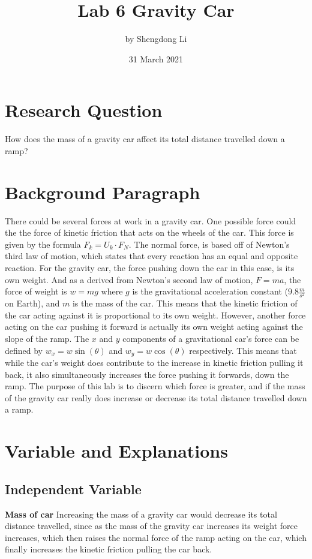 \documentclass[12pt]{article}
\begin{document}
\title{Lab 6 Gravity Car}
\author{by Shengdong Li}
\date{31 March 2021}
\maketitle

\section{Research Question}

How does the mass of a gravity car affect its total distance travelled down a ramp? 

\section{Background Paragraph}

There could be several forces at work in a gravity car. One possible force could the the force of kinetic friction that acts on the wheels of the car. This force is given by the formula \(F_k=U_k\cdot F_N\). The normal force, is based off of Newton's third law of motion, which states that every reaction has an equal and opposite reaction. For the gravity car, the force pushing down the car in this case, is its own weight. And as a derived from Newton's second law of motion, \(F=ma\), the force of weight is \(w=mg\) where \(g\) is the gravitational acceleration constant (\(9.8\frac{m}{s^2}\) on Earth), and \(m\) is the mass of the car. This means that the kinetic friction of the car acting against it is proportional to its own weight. However, another force acting on the car pushing it forward is actually its own weight acting against the slope of the ramp. The \(x\) and \(y\) components of a gravitational car's force can be defined by \(w_x=w\sin(\theta)\) and \(w_y=w\cos(\theta)\) respectively. This means that while the car's weight does contribute to the increase in kinetic friction pulling it back, it also simultaneously increases the force pushing it forwards, down the ramp. The purpose of this lab is to discern which force is greater, and if the mass of the gravity car really does increase or decrease its total distance travelled down a ramp.

\section{Variable and Explanations}

\subsection{Independent Variable} \textbf{Mass of car} Increasing the mass of a gravity car would decrease its total distance travelled, since as the mass of the gravity car increases its weight force increases, which then raises the normal force of the ramp acting on the car, which finally increases the kinetic friction pulling the car back.
\end{document}
